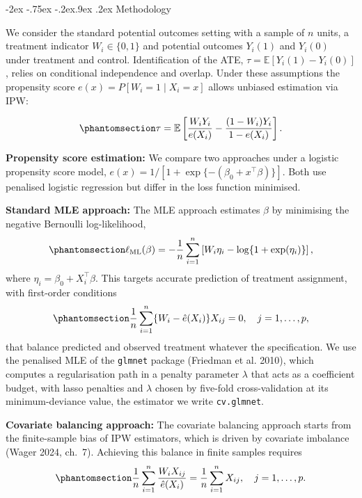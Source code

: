 \documentclass[
  12pt,
  a4paper,
]{article}
\makeatletter
\renewcommand\subsection{\@startsection{subsection}{2}{\z@}%
  {-2ex \@plus -.75ex \@minus -.2ex}{.9ex \@plus .2ex}%
  {\normalfont\large\bfseries}}
\makeatother
\begin{document}
\subsection{Methodology}\label{methodology}

We consider the standard potential outcomes setting with a sample of
\(n\) units, a treatment indicator \(W_i \in \{0, 1\}\) and potential
outcomes \(Y_i(1)\) and \(Y_i(0)\) under treatment and control.
Identification of the ATE, \(\tau = \mathbb{E}[Y_i(1) - Y_i(0)]\),
relies on conditional independence and overlap. Under these assumptions
the propensity score \(e(x) = P[W_i = 1 \mid X_i = x]\) allows unbiased
estimation via IPW:

\begin{equation}\protect\phantomsection\label{eq-ipw}{\tau = \mathbb{E}\left[\frac{W_i Y_i}{e(X_i)} - \frac{(1 - W_i) Y_i}{1 - e(X_i)}\right].}\end{equation}

\textbf{Propensity score estimation:} We compare two approaches under a
logistic propensity score model,
\(e(x) = 1 / [1 + \exp\{-(\beta_0 + x^\top \beta)\}]\). Both use
penalised logistic regression but differ in the loss function minimised.

\textbf{Standard MLE approach:} The MLE approach estimates \(\beta\) by
minimising the negative Bernoulli log-likelihood,
\begin{equation}\protect\phantomsection\label{eq-mle}{\ell_{\text{ML}}(\beta) = -\frac{1}{n} \sum_{i=1}^{n} \left[ W_i \eta_i - \log\{1 + \exp(\eta_i)\} \right],}\end{equation}
where \(\eta_i = \beta_0 + X_i^\top \beta\). This targets accurate
prediction of treatment assignment, with first-order conditions
\begin{equation}\protect\phantomsection\label{eq-mle-foc}{\frac{1}{n} \sum_{i=1}^{n} \{ W_i - \hat{e}(X_i) \} X_{ij} = 0, \quad j = 1, \ldots, p,}\end{equation}
that balance predicted and observed treatment whatever the
specification. We use the penalised MLE of the \texttt{glmnet} package
(Friedman et al. 2010), which computes a regularisation path in a
penalty parameter \(\lambda\) that acts as a coefficient budget, with
lasso penalties and \(\lambda\) chosen by five-fold cross-validation at
its minimum-deviance value, the estimator we write \texttt{cv.glmnet}.

\textbf{Covariate balancing approach:} The covariate balancing approach
starts from the finite-sample bias of IPW estimators, which is driven by
covariate imbalance (Wager 2024, ch.~7). Achieving this balance in
finite samples requires
\begin{equation}\protect\phantomsection\label{eq-exactbalance}{\frac{1}{n} \sum_{i=1}^{n} \frac{W_i X_{ij}}{\hat{e}(X_i)} = \frac{1}{n} \sum_{i=1}^{n} X_{ij}, \quad j = 1, \ldots, p.}\end{equation}
\end{document}
